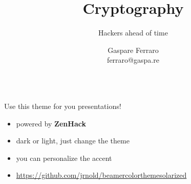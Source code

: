 \documentclass[xcolor=dvipsnames,aspectratio=169]{beamer}
\title{Cryptography}
\author{Gaspare Ferraro\\ferraro@gaspa.re}
\subtitle{Hackers ahead of time}
\begin{document}
\begin{frame}[plain]
\maketitle
\begin{columns}
	
\end{columns}
\end{frame}

\begin{frame}
\begin{theorem}
Use this theme for you presentations!
\end{theorem}

\begin{itemize}[<+->]
	\item powered by \textbf{ZenHack}
	\item dark or light, just change the theme
	\item you can personalize the accent
	\item \url{https://github.com/jrnold/beamercolorthemesolarized}
\end{itemize}
\end{frame}
\end{document}
